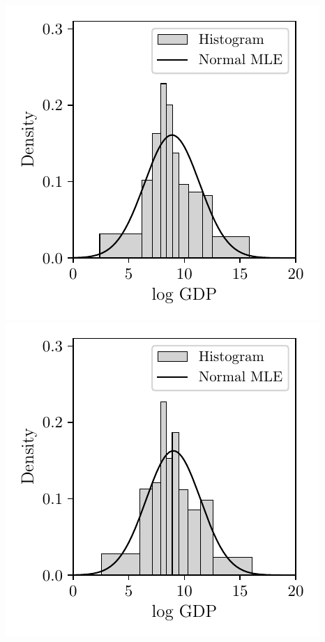 \documentclass{article}
\begin{document}
\includegraphics[scale=0.5]{graphics/trade_gdp_1995.pdf}
\includegraphics[scale=0.5]{graphics/trade_gdp_2000.pdf}
\end{document}
